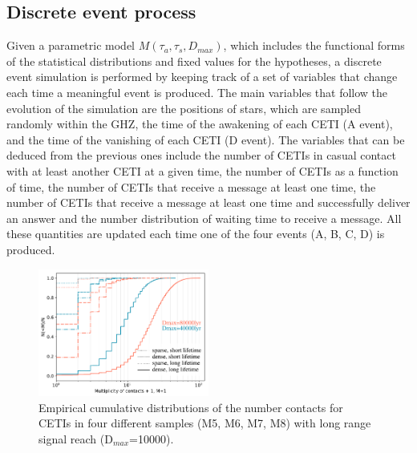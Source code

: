 \documentclass[crop]{CSLB}%
\begin{document}

\subsection{Discrete event process}

Given a parametric model $M(\tau_a, \tau_s, D_{max})$, which includes the
functional forms of the statistical distributions and fixed values for the
hypotheses, a discrete event simulation is performed by keeping track of a set
of variables that change each time a meaningful event is produced.
%
The main variables that follow the evolution of the simulation are the positions
of stars, which are sampled randomly within the GHZ, the time of the awakening
of each CETI (A event), and the time of the vanishing of each CETI (D event).
%
The variables that can be deduced from the previous ones include the number of
CETIs in casual contact with at least another CETI at a given time, the number
of CETIs as a function of time, the number of CETIs that receive a message at
least one time, the number of CETIs that receive a message at least one time and
successfully deliver an answer and the number distribution of waiting time to
receive a message.
%
All these quantities are updated each time one of the four events (A, B, C, D)
is produced.




                 
\begin{figure} \centering
   \includegraphics[width=0.5\textwidth]{F1.pdf}
   \caption{Empirical cumulative distributions of the number contacts
   for CETIs in four different samples (M5, M6, M7, M8) with long
   range signal reach (D$_{max}$=10000).
   }
\label{F_number_of_contacts} \end{figure}
   

\end{document}
